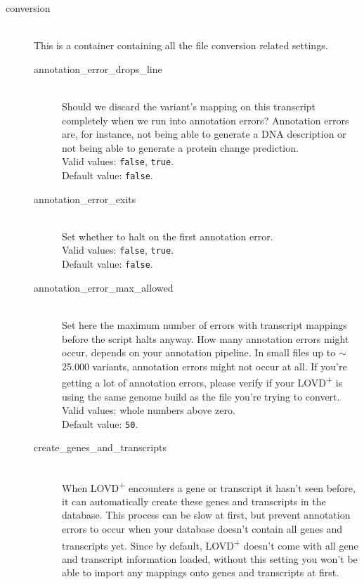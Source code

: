 \begin{description}
  \item[conversion] \hfill \\
    This is a container containing all the file conversion related settings.
  \begin{description}
    \item[annotation\_error\_drops\_line] \hfill \\
      Should we discard the variant's mapping on this transcript completely when we run into annotation errors?
      Annotation errors are, for instance, not being able to generate a DNA description or
       not being able to generate a protein change prediction.\\
      Valid values: \texttt{false}, \texttt{true}.\\
      Default value: \texttt{false}.
    \item[annotation\_error\_exits] \hfill \\
      Set whether to halt on the first annotation error.\\
      Valid values: \texttt{false}, \texttt{true}.\\
      Default value: \texttt{false}.
    \item[annotation\_error\_max\_allowed] \hfill \\
      Set here the maximum number of errors with transcript mappings before the script halts anyway.
      How many annotation errors might occur, depends on your annotation pipeline.
      In small files up to $\sim$25.000 variants, annotation errors might not occur at all.
      If you're getting a lot of annotation errors, please verify if your
       LOVD\textsuperscript{+} is using the same genome build as the file you're trying to convert.\\
      Valid values: whole numbers above zero.\\
      Default value: \texttt{50}.
    \item[create\_genes\_and\_transcripts] \hfill \\
      When LOVD\textsuperscript{+} encounters a gene or transcript it hasn't seen before, it can automatically create
       these genes and transcripts in the database.
      This process can be slow at first, but prevent annotation errors to occur
       when your database doesn't contain all genes and transcripts yet.
      Since by default, LOVD\textsuperscript{+} doesn't come with all gene and transcript information loaded,
       without this setting you won't be able to import any mappings onto genes and transcripts at first.\\

\end{description}
\end{description}
